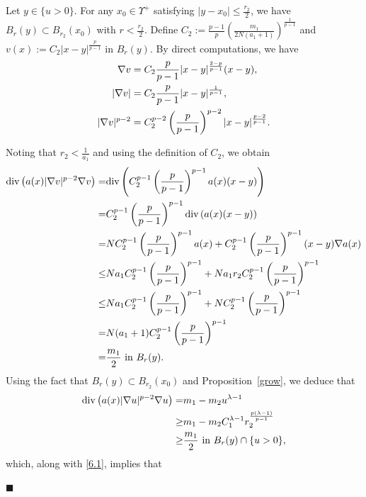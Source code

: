 \documentclass[onecolumn]{autart}
\newenvironment{proof}{{\it Proof: \enspace}}{\hfill $\blacksquare$\par}
\begin{document}
	\begin{proof}
		Let $y\in\{u>0\}$. For any $x_0\in\Upsilon^+$ satisfying $|y-x_{0}|\leq\frac{r_2}{2}$, we have $B_{r}(y)\subset B_{r_2}(x_{0})$ with $r<\frac{r_2}{2}$. Define $C_2:=\frac{p-1}{p}\left(\frac{m_1}{2N(a_1+1)}\right)^{\frac{1}{p-1}}$ and $v(x):=C_2|x-y|^{\frac{p}{p-1}}$ in $B_{r}(y)$. By  direct computations, we have
		\begin{align}
			\nabla v&=C_2\frac{p}{p-1}|x-y|^{\frac{2-p}{p-1}}(x-y),\notag\\
			|\nabla v|&=C_2\frac{p}{p-1}|x-y|^{\frac{1}{p-1}},\notag\\
			|\nabla v|^{p-2}&=C_2^{p-2}\left( \frac{p}{p-1}\right) ^{p-2}|x-y|^{\frac{p-2}{p-1}}\notag.
		\end{align}
		
		Noting that $r_2 < \frac{1}{a_1}$ and using the definition of $C_2$,  we obtain
		\begin{align}
			\mathrm{div}\left(a(x)|\nabla v|^{p-2}\nabla v\right)
			=
			&\mathrm{div}\left(C_2^{p-1}\left(\frac{p}{p-1}\right)^{p-1}a(x)(x-y)\right)
			\notag\\ =
			&C_2^{p-1}\left(\frac{p}{p-1}\right)^{p-1}\mathrm{div}\left( a(x)(x-y)\right)
			\notag\\ =
			&NC_2^{p-1}\left(\frac{p}{p-1}\right)^{p-1}a(x) + C_2^{p-1}\left(\frac{p}{p-1}\right)^{p-1}(x-y)\nabla a(x)
			\notag\\\leq
			& Na_1C_2^{p-1}\left(\frac{p}{p-1}\right)^{p-1} + Na_1r_2C_2^{p-1}\left(\frac{p}{p-1}\right)^{p-1}
			\notag\\ \leq
			&Na_1C_2^{p-1}\left(\frac{p}{p-1}\right)^{p-1} + NC_2^{p-1}\left(\frac{p}{p-1}\right)^{p-1}
			\notag\\ =
			&N(a_1+1)C_2^{p-1}\left(\frac{p}{p-1}\right)^{p-1}
			\notag\\ =
			&\frac{m_1}{2}\   \text{in}\   B_{r}(y).\label{6.1}
		\end{align}
		Using the fact that  $B_r(y) \subset B_{r_2}(x_0)$ and Proposition~\ref{grow}, we deduce that
		\begin{align*}
			\mathrm{div}\left(a(x)|\nabla u|^{p-2}\nabla u\right)
			=
			&  m_1 - m_2 u^{\lambda-1}
			\notag\\ \geq
			&  m_1 -  m_2 C_1^{\lambda-1} r_{2}^{\frac{p(\lambda-1)}{p-1}}
			\notag\\ \geq
			&\frac{m_1}{2}\   \text{in}\   B_r(y) \cap \{u > 0\},%
		\end{align*}
		which, along with \eqref{6.1}, implies that

\end{proof}
\end{document}

